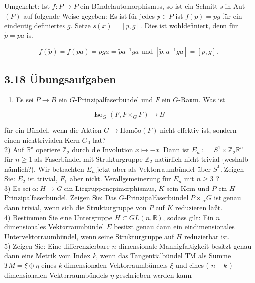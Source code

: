 Umgekehrt: Ist $f: P \rightarrow P$ ein Bündelautomorphismus, so ist ein Schnitt $s$ in Aut $(P)$ auf folgende Weise gegeben: Es ist für jedes $p \in P$ ist $f(p)=p g$ für ein eindeutig definiertes $g$. Setze $s(x)=[p, g]$. Dies ist wohldefiniert, denn für $\tilde{p}=p a$ ist

$$
f(\tilde{p})=f(p a)=p g a=\tilde{p} a^{-1} g a \text { und }\left[\tilde{p}, a^{-1} g a\right]=[p, g] .
$$

\subsection*{3.18 Übungsaufgaben}
\begin{enumerate}
  \item Es sei $P \rightarrow B$ ein $G$-Prinzipalfaserbündel und $F$ ein $G$-Raum. Was ist
\end{enumerate}

$$
\operatorname{Iso}_{G}\left(F, P \times_{G} F\right) \rightarrow B
$$

für ein Bündel, wenn die Aktion $G \rightarrow \text{Homöo}(F)$ nicht effektiv ist, sondern einen nichttrivialen Kern $G_{0}$ hat?\\
2) Auf $\mathbb{R}^{n}$ operiere $\mathbb{Z}_{2}$ durch die Involution $x \mapsto-x$. Dann ist $E_{n}:=$ $S^{1} \times \mathbb{Z}_{2} \mathbb{R}^{n}$ für $n \geq 1$ als Faserbündel mit Strukturgruppe $\mathbb{Z}_{2}$ natürlich nicht trivial (weshalb nämlich?). Wir betrachten $E_{n}$ jetzt aber als Vektorraumbündel über $S^{1}$. Zeigen Sie: $E_{2}$ ist trivial, $E_{1}$ aber nicht. Verallgemeinerung für $E_{n}$ mit $n \geq 3$ ?\\
3) Es sei $\alpha: H \rightarrow G$ ein Liegruppenepimorphismus, $K$ sein Kern und $P$ ein $H$-Prinzipalfaserbündel. Zeigen Sie: Das $G$-Prinzipalfaserbündel $P \times{ }_{\alpha} G$ ist genau dann trivial, wenn sich die Strukturgruppe von $P$ auf $K$ reduzieren läßt.\\
4) Bestimmen Sie eine Untergruppe $H \subset G L(n, \mathbb{R})$, sodass gilt: Ein $n$ dimensionales Vektorraumbündel $E$ besitzt genau dann ein eindimensionales Untervektorraumbündel, wenn seine Strukturgruppe auf $H$ reduzierbar ist.\\
5) Zeigen Sie: Eine differenzierbare $n$-dimensionale Mannigfaltigkeit besitzt genau dann eine Metrik vom Index $k$, wenn das Tangentialbündel TM als Summe $T M=\xi \oplus \eta$ eines $k$-dimensionalen Vektorraumbündels $\xi$ und eines ( $n-k$ )-dimensionalen Vektorraumbündels $\eta$ geschrieben werden kann.



